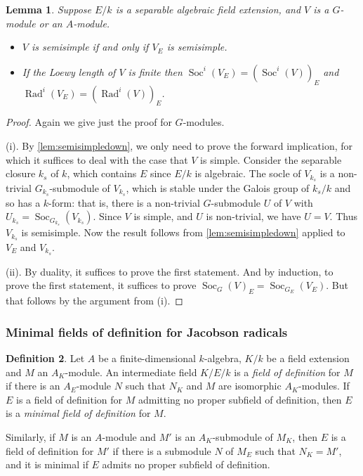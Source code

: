 \documentclass[11pt,reqno]{amsart}
\newtheorem{lemma}{Lemma}[subsection]
\theoremstyle{definition}
\theoremstyle{remark}
\theoremstyle{definition}
\newtheorem{defn}[lemma]{Definition}
\theoremstyle{plain}
\DeclareMathOperator{\Rad}{Rad}
\DeclareMathOperator{\Soc}{Soc}
\begin{document}
\begin{lemma}\label{lem:sepext}
Suppose $E/k$ is a separable algebraic field extension, and $V$ is a $G$-module or an $A$-module.
\begin{itemize}
\item[(i)] $V$ is semisimple if and only if $V_{E}$ is semisimple.
\item[(ii)] If the Loewy length of $V$ is finite then $\Soc^i(V_{E})=(\Soc^i(V))_{E}$ and $\Rad^i(V_{E})=(\Rad^i(V))_{E}$.
\end{itemize}
\end{lemma}

\begin{proof} Again we give just the proof for $G$-modules. 

(i). By \cref{lem:semisimpledown}, we only need to prove the forward implication, for which it suffices to deal with the case that $V$ is simple.
Consider the separable closure $k_s$ of $k$, which contains $E$ since $E/k$ is algebraic.
The socle of $V_{k_s}$ is a non-trivial $G_{k_s}$-submodule of $V_{k_s}$, which is stable under the Galois group of $k_s/k$ and so
has a $k$-form: that is, there is a non-trivial $G$-submodule $U$ of $V$ with $U_{k_s} = \Soc_{G_{k_s}}(V_{k_s})$.
Since $V$ is simple, and $U$ is non-trivial, we have $U=V$.
Thus $V_{k_s}$ is semisimple.
Now the result follows from \cref{lem:semisimpledown} applied to $V_{E}$ and $V_{k_s}$.

(ii). By duality, it suffices to prove the first statement. And by induction, to prove the first statement, it suffices to prove $\Soc_G(V)_{E}=\Soc_{G_{E}}(V_{E})$. 
But that follows by the argument from (i).
\end{proof}

\subsubsection{Minimal fields of definition for Jacobson radicals} 
\begin{defn}Let $A$ be a finite-dimensional $k$-algebra, $K/k$ be a field extension and $M$ an $A_K$-module. An intermediate field $K/E/k$ is a \emph{field of definition} for $M$ if there is an $A_E$-module $N$ such that $N_K$ and $M$ are isomorphic $A_K$-modules. If $E$ is a field of definition for $M$ admitting no proper subfield of definition, then $E$ is a \emph{minimal field of definition} for $M$.

  Similarly, if $M$ is an $A$-module and $M'$ is an $A_K$-submodule of $M_K$, then $E$ is a field of definition for $M'$ if there is a submodule $N$ of $M_E$ such that $N_K=M'$, and it is minimal if $E$ admits no proper subfield of definition.
\end{defn}
\end{document}

